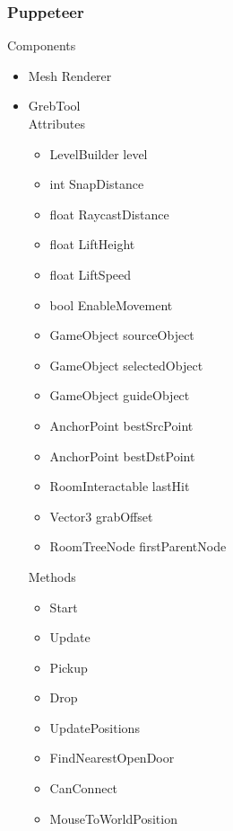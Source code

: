 \documentclass[11pt]{article}
\begin{document}
\subsubsection{Puppeteer}
Components
\begin{itemize}
\item Mesh Renderer
\item GrebTool
\\Attributes
\begin{itemize}
\item LevelBuilder level
\item int SnapDistance
\item float RaycastDistance
\item float LiftHeight
\item float LiftSpeed
\item bool EnableMovement
\item GameObject sourceObject
\item GameObject selectedObject
\item GameObject guideObject
\item AnchorPoint bestSrcPoint
\item AnchorPoint bestDstPoint
\item RoomInteractable lastHit
\item Vector3 grabOffset
\item RoomTreeNode firstParentNode
\end{itemize}
Methods
\begin{itemize}
\item Start
\item Update
\item Pickup
\item Drop
\item UpdatePositions
\item FindNearestOpenDoor
\item CanConnect
\item MouseToWorldPosition
\end{itemize}
\end{itemize}
\end{document}
